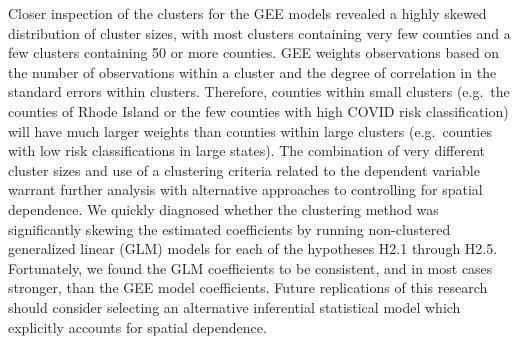 \documentclass[
]{article}
\begin{document}
Closer inspection of the clusters for the GEE models revealed a highly
skewed distribution of cluster sizes, with most clusters containing very
few counties and a few clusters containing 50 or more counties. GEE
weights observations based on the number of observations within a
cluster and the degree of correlation in the standard errors within
clusters. Therefore, counties within small clusters (e.g.~the counties
of Rhode Island or the few counties with high COVID risk classification)
will have much larger weights than counties within large clusters
(e.g.~counties with low risk classifications in large states). The
combination of very different cluster sizes and use of a clustering
criteria related to the dependent variable warrant further analysis with
alternative approaches to controlling for spatial dependence. We quickly
diagnosed whether the clustering method was significantly skewing the
estimated coefficients by running non-clustered generalized linear (GLM)
models for each of the hypotheses H2.1 through H2.5. Fortunately, we
found the GLM coefficients to be consistent, and in most cases stronger,
than the GEE model coefficients. Future replications of this research
should consider selecting an alternative inferential statistical model
which explicitly accounts for spatial dependence.
\end{document}
